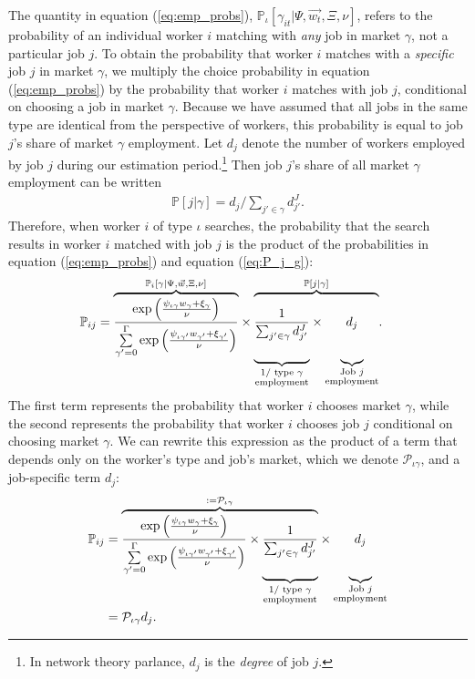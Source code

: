 \documentclass[12pt]{article}
\def\ig{\iota\gamma}
\def\g{\gamma}
\def\i{\iota}
\def\Pig{\frac{\exp \left( \frac{\psi_{\ig} 
			w_{\g} + \xi_{\g}}{\nu} \right) }{ \sum\limits_{\g'=0}^{\Gamma} \exp \left( \frac{\psi_{\ig'} w_{\g'} + \xi_{\g'}}{\nu} \right) }}
\renewcommand{\P}{\mathbb {P}}
\theoremstyle{definition}
\theoremstyle{plain}
\begin{document}
The quantity in equation (\ref{eq:emp_probs}), $\P_{\i}[\g_{it}|\Psi,\vec{w_t},\Xi,\nu]$, refers to the probability of an individual worker $i$ matching with \emph{any} job in market $\g$, not a particular job $j$. To obtain the probability that worker $i$ matches with a \emph{specific} job $j$ in market $\g$, we multiply the choice probability in equation (\ref{eq:emp_probs}) by the probability that worker $i$ matches with job $j$, conditional on choosing a job in market $\g$. Because we have assumed that all jobs in the same type are identical from the perspective of workers, this probability is equal to job $j$'s share of market $\g$ employment. Let $d_j$ denote the number of workers employed by job $j$ during our estimation period.\footnote{In network theory parlance, $d_j$ is the \emph{degree} of job $j$.} Then job $j$'s share of all market $\g$ employment can be written 
\begin{align}
	\P[j|\g] = d_j/\sum_{j' \in \g} d_{j'}^{J}. \label{eq:P_j_g}
\end{align}  
Therefore, when worker $i$ of type $\i$ searches, the probability that the search results in worker $i$ matched with job $j$ is the product of the probabilities in equation (\ref{eq:emp_probs}) and equation (\ref{eq:P_j_g}): 
\begin{align}
\P_{ij}  &= 
\overset{\P_i[\g | \Psi,\vec{w},\Xi,\nu] }{\overbrace{\Pig }} 
\times \overset{\P[j|\g]}{\overbrace{\underset{\substack{1/ \text{ type } \g \\ \text{employment}  }}{ 	
			\underbrace{ \vphantom{\Pig} \frac{1}{\sum_{j' \in \g} d_{j'}^{J} } }} 
		\times \underset{\substack{\text{Job }j \\  \text{employment}}}{\underbrace{ \vphantom{\Pig} d_j}}    }} .
\end{align}
The first term represents the probability that worker $i$ chooses market $\gamma$, while the second represents the probability that worker $i$ chooses job $j$ conditional on choosing market $\gamma$. We can rewrite this expression as the product of a term that depends only on the worker's type and job's market, which we denote $\mathcal{P}_{\ig}$, and a job-specific term $d_j$:
\begin{align}
\P_{ij} &= \overset{ := \mathcal{P}_{\ig}}{\overbrace{
		\Pig 
		\times  \underset{\substack{1/ \text{ type } \g \\ \text{employment}  }}{ 	
			\underbrace{{ \vphantom{\Pig} \frac{1}{\sum_{j' \in \g} d_{j'}^{J} } }}}    }} \times \underset{\substack{\text{Job }j \\  \text{employment}}}{\underbrace{ \vphantom{\Pig} d_j}} \\
		&=  \mathcal{P}_{\ig} d_j . \nonumber \label{eq:P_ij}
\end{align}
\end{document}
